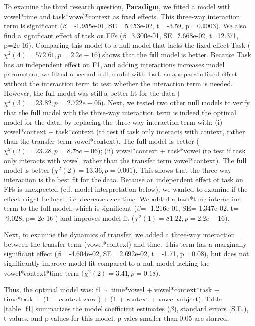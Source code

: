 \documentclass[12 pt]{article}
\begin{document}
To examine the third research question, \textbf{Paradigm}, we fitted a model with vowel*time and task*vowel*context as fixed effects. This three-way interaction term is significant ($\beta$= -1.955e-01, SE=  5.453e-02, t= -3.59, p= 0.0003). We also find a significant effect of task on FFs ($\beta$=3.300e-01, SE=2.668e-02, t=12.371, p=2e-16). Comparing this model to a null model that lacks the fixed effect Task ($\chi^2(4) = 572.61, p=  2.2e-16$) shows that the full model is better. Because Task has an independent effect on F1, and adding interactions increases model parameters, we fitted a second null model with Task as a separate fixed effect without the interaction term to test whether the interaction term is needed. However, the full model was still a better fit for the data ($\chi^2(3) = 23.82, p=  2.722e-05$). Next, we tested two other null models to verify that the full model with the three-way interaction term is indeed the optimal model for the data, by replacing the three-way interaction term with: (i) vowel*context + task*context (to test if task only interacts with context, rather than the transfer term vowel*context). The full model is better ($\chi^2(2) = 23.28, p= 8.78e-06$); (ii) vowel*context + task*vowel (to test if task only interacts with vowel, rather than the transfer term vowel*context). The full model is better ($\chi^2(2) = 13.36, p= 0.001$). This shows that the three-way interaction is the best fit for the data. Because an independent effect of task on FFs is unexpected (c.f. model interpretation below), we wanted to examine if the effect might be local, i.e. decrease over time. We added a task*time interaction term to the full model, which is significant ($\beta$= -1.216e-01, SE=  1.347e-02, t= -9.028, p= 2e-16 ) and improves model fit ($\chi^2(1) = 81.22, p= 2.2e-16$).

Next, to examine the dynamics of transfer, we added a three-way interaction between the transfer term (vowel*context) and time. This term has a marginally significant effect ($\beta$= -4.604e-02, SE=  2.692e-02, t= -1.71, p= 0.08), but does not significantly improve model fit compared to a null model lacking the vowel*context*time term ($\chi^2(2) = 3.41, p= 0.18$).

Thus, the optimal model was: f1 $\sim$ time*vowel + vowel*context*task + time*task + (1 + context|word) + (1 + context + vowel|subject). Table \ref{table_f1} summarizes the model coefficient estimates ($\beta$), standard errors (S.E.), t-values, and p-values for this model. p-vales smaller than 0.05 are starred. 
\end{document}
